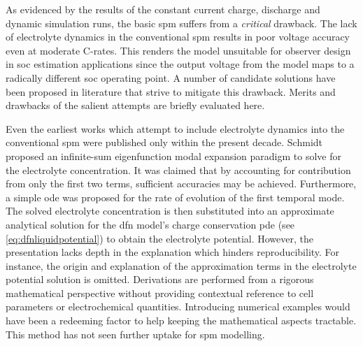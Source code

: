 
As  evidenced by  the  results of  the constant  current  charge, discharge  and
dynamic  simulation runs,  the basic  \gls{spm} suffers  from a  \emph{critical}
drawback. The lack of electrolyte dynamics in the conventional \gls{spm} results
in poor  voltage accuracy  even at  moderate {C-rates}.  This renders  the model
unsuitable for  observer design in  \gls{soc} estimation applications  since the
output voltage from the model maps  to a radically different \gls{soc} operating
point. A  number of candidate  solutions have  been proposed in  literature that
strive to mitigate  this drawback. Merits and drawbacks of  the salient attempts
are briefly evaluated here.

Even  the  earliest   works  which  attempt  to   include  electrolyte  dynamics
into  the  conventional  \gls{spm}  were   published  only  within  the  present
decade. Schmidt~\etal~\cite{Schmidt2010c} proposed an infinite-sum eigenfunction
modal  expansion  paradigm  to  solve  for  the  electrolyte  concentration.  It
was  claimed  that by  accounting  for  contribution  from  only the  first  two
terms, sufficient  accuracies may be  achieved. Furthermore, a  simple \gls{ode}
was  proposed  for  the rate  of  evolution  of  the  first temporal  mode.  The
solved  electrolyte  concentration  is  then  substituted  into  an  approximate
analytical solution for the \gls{dfn} model's charge conservation \gls{pde} (see
\cref{eq:dfnliquidpotential}) to obtain the  electrolyte potential. However, the
presentation lacks depth  in the explanation which  hinders reproducibility. For
instance,  the  origin  and  explanation  of  the  approximation  terms  in  the
electrolyte  potential solution  is omitted.  Derivations are  performed from  a
rigorous mathematical perspective without providing contextual reference to cell
parameters or  electrochemical quantities. Introducing numerical  examples would
have been a redeeming factor to help keeping the mathematical aspects tractable.
This method has not seen further uptake for \gls{spm} modelling.

